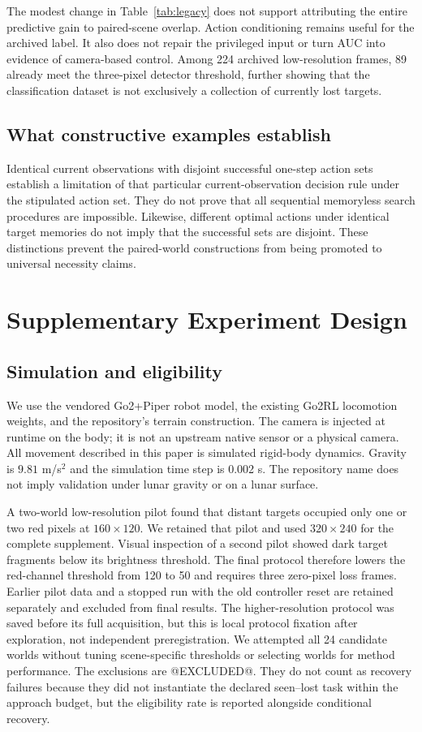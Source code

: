 \documentclass[10pt,twocolumn,a4paper]{article}
\begin{document}
The modest change in Table~\ref{tab:legacy} does not support attributing the entire predictive gain to paired-scene overlap. Action conditioning remains useful for the archived label. It also does not repair the privileged input or turn AUC into evidence of camera-based control. Among 224 archived low-resolution frames, 89 already meet the three-pixel detector threshold, further showing that the classification dataset is not exclusively a collection of currently lost targets.

\subsection{What constructive examples establish}
Identical current observations with disjoint successful one-step action sets establish a limitation of that particular current-observation decision rule under the stipulated action set. They do not prove that all sequential memoryless search procedures are impossible. Likewise, different optimal actions under identical target memories do not imply that the successful sets are disjoint. These distinctions prevent the paired-world constructions from being promoted to universal necessity claims.

\section{Supplementary Experiment Design}
\subsection{Simulation and eligibility}
We use the vendored Go2+Piper robot model, the existing Go2RL locomotion weights, and the repository's terrain construction. The camera is injected at runtime on the body; it is not an upstream native sensor or a physical camera. All movement described in this paper is simulated rigid-body dynamics. Gravity is $9.81$ m/s$^2$ and the simulation time step is 0.002 s. The repository name does not imply validation under lunar gravity or on a lunar surface.

A two-world low-resolution pilot found that distant targets occupied only one or two red pixels at $160\times120$. We retained that pilot and used $320\times240$ for the complete supplement. Visual inspection of a second pilot showed dark target fragments below its brightness threshold. The final protocol therefore lowers the red-channel threshold from 120 to 50 and requires three zero-pixel loss frames. Earlier pilot data and a stopped run with the old controller reset are retained separately and excluded from final results. The higher-resolution protocol was saved before its full acquisition, but this is local protocol fixation after exploration, not independent preregistration. We attempted all 24 candidate worlds without tuning scene-specific thresholds or selecting worlds for method performance. The exclusions are @EXCLUDED@. They do not count as recovery failures because they did not instantiate the declared seen--lost task within the approach budget, but the eligibility rate is reported alongside conditional recovery.
\end{document}
